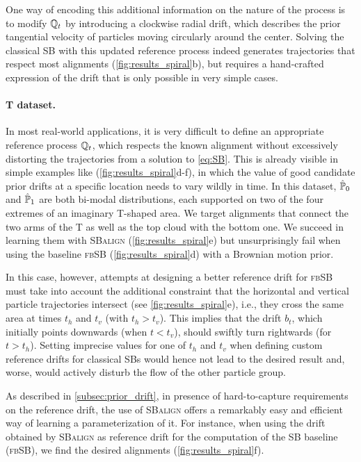 One way of encoding this additional information on the nature of the process is to modify $\mathbb{Q}_{ t }$ by introducing a clockwise radial drift, which describes the prior tangential velocity of particles moving circularly around the center.
Solving the classical SB with this updated reference process indeed generates trajectories that respect most alignments (\cref{fig:results_spiral}b), but requires a hand-crafted expression of the drift that is only possible in very simple cases.

\paragraph{T dataset.}
In most real-world applications, it is very difficult to define an appropriate reference process $\mathbb{Q}_{ t }$, which respects the known alignment without excessively distorting the trajectories from a solution to \eqref{eq:SB}. This is already visible in simple examples like (\cref{fig:results_spiral}d-f), in which the value of good candidate prior drifts at a specific location needs to vary wildly in time.
In this dataset, $\hat{\mathbb{P}}_{ {0} }$ and $\hat{\mathbb{P}}_{ {1}}$ are both bi-modal distributions, each supported on two of the four extremes of an imaginary T-shaped area.
We target alignments that connect the two arms of the T as well as the top cloud with the bottom one. We succeed in learning them with \textsc{SBalign} (\cref{fig:results_spiral}e) but unsurprisingly fail when using the baseline \textsc{fbSB} (\cref{fig:results_spiral}d) with a Brownian motion prior.

 In this case, however, attempts at designing a better reference drift for \textsc{fbSB} must take into account the additional constraint that the horizontal and vertical particle trajectories intersect (see \cref{fig:results_spiral}e), i.e., they cross the same area at times $t_h$ and $t_v$ (with $t_h > t_v$). This implies that the drift $b_t$, which initially points downwards (when $t < t_v$), should swiftly turn rightwards (for $t > t_h$).
Setting imprecise values for one of $t_h$ and $t_v$ when defining custom reference drifts for classical SBs would hence not lead to the desired result and, worse, would actively disturb the flow of the other particle group.

 As described in \cref{subsec:prior_drift}, in presence of hard-to-capture requirements on the reference drift, the use of \textsc{SBalign} offers a remarkably easy and efficient way of learning a parameterization of it. For instance, when using the drift obtained by \textsc{SBalign} as reference drift for the computation of the SB baseline (\textsc{fbSB}), we find the desired alignments (\cref{fig:results_spiral}f).

